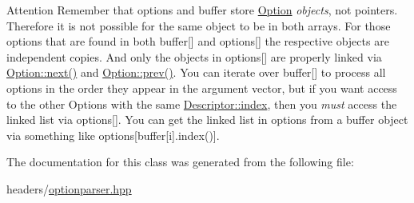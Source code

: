 \begin{DoxyAttention}{Attention}
Remember that {\ttfamily options} and {\ttfamily buffer} store \hyperlink{classoption_1_1Option}{Option} {\itshape objects}, not pointers. Therefore it is not possible for the same object to be in both arrays. For those options that are found in both {\ttfamily buffer}\mbox{[}\mbox{]} and {\ttfamily options}\mbox{[}\mbox{]} the respective objects are independent copies. And only the objects in {\ttfamily options}\mbox{[}\mbox{]} are properly linked via \hyperlink{classoption_1_1Option_a59ae9aed505f4d410633bb36478a32be}{Option\+::next()} and \hyperlink{classoption_1_1Option_a4d12001a91b0b35cf47437d0c60d2b52}{Option\+::prev()}. You can iterate over {\ttfamily buffer}\mbox{[}\mbox{]} to process all options in the order they appear in the argument vector, but if you want access to the other Options with the same \hyperlink{structoption_1_1Descriptor_a1fee8ac44f529c99ac2b1149b4c391b1}{Descriptor\+::index}, then you {\itshape must} access the linked list via {\ttfamily options}\mbox{[}\mbox{]}. You can get the linked list in options from a buffer object via something like {\ttfamily options}\mbox{[}buffer\mbox{[}i\mbox{]}.index()\mbox{]}. 
\end{DoxyAttention}


The documentation for this class was generated from the following file\+:\begin{DoxyCompactItemize}
\item 
headers/\hyperlink{optionparser_8hpp}{optionparser.\+hpp}\end{DoxyCompactItemize}

